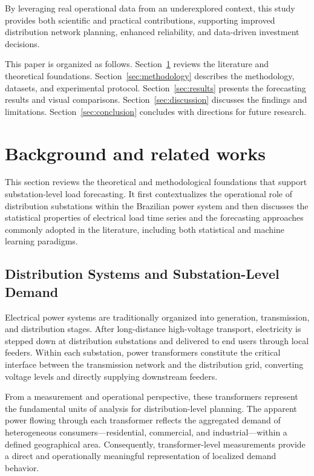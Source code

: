 By leveraging real operational data from an underexplored context, this study provides both scientific and practical contributions, supporting improved distribution network planning, enhanced reliability, and data-driven investment decisions.

This paper is organized as follows. Section~\ref{sec:1} reviews the literature and theoretical foundations. Section~\ref{sec:methodology} describes the methodology, datasets, and experimental protocol. Section~\ref{sec:results} presents the forecasting results and visual comparisons. Section~\ref{sec:discussion} discusses the findings and limitations. Section~\ref{sec:conclusion} concludes with directions for future research.

\section{Background and related works}
\label{sec:1}

This section reviews the theoretical and methodological foundations that support substation-level load forecasting. It first contextualizes the operational role of distribution substations within the Brazilian power system and then discusses the statistical properties of electrical load time series and the forecasting approaches commonly adopted in the literature, including both statistical and machine learning paradigms.

\subsection{Distribution Systems and Substation-Level Demand}

Electrical power systems are traditionally organized into generation, transmission, and distribution stages. After long-distance high-voltage transport, electricity is stepped down at distribution substations and delivered to end users through local feeders. Within each substation, power transformers constitute the critical interface between the transmission network and the distribution grid, converting voltage levels and directly supplying downstream feeders.

From a measurement and operational perspective, these transformers represent the fundamental units of analysis for distribution-level planning. The apparent power flowing through each transformer reflects the aggregated demand of heterogeneous consumers—residential, commercial, and industrial—within a defined geographical area. Consequently, transformer-level measurements provide a direct and operationally meaningful representation of localized demand behavior.

